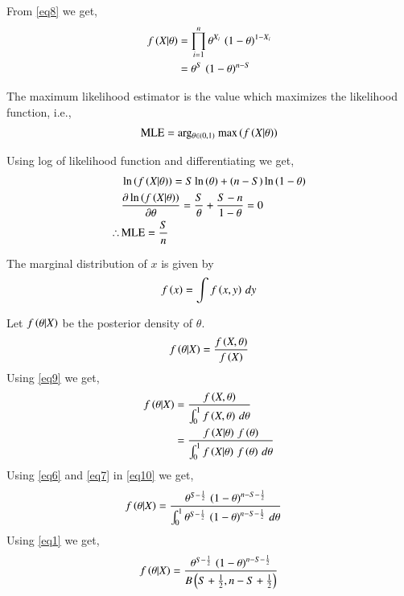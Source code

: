 \documentclass[journal,12pt,twocolumn]{IEEEtran}
\begin{document}
From \eqref{eq8} we get,
\begin{align}
    f\left(X|\theta\right) &= \prod_{i=1}^n\theta^{X_i}\,\left(1-\theta\right)^{1-X_i}\nonumber\\
    &=\theta^S\,\left(1-\theta\right)^{n-S}\label{eq7}
\end{align}
\begin{definition}
The maximum likelihood estimator is the value which maximizes the likelihood function, i.e.,
\begin{align}
    \text{MLE} = \text{arg$_{\theta \in (0,1)}$ max}\left(f\left(X|\theta\right)\right)
\end{align}
\end{definition}
Using log of likelihood function and differentiating we get,
\begin{align}
    &\ln\left({f\left(X|\theta\right)}\right) = S\ln\left({\theta}\right) + \left(n-S\right)\ln\left({1-\theta}\right)\\
    &\frac{\partial \ln\left({f\left(X|\theta\right)}\right)}{\partial \theta} = \frac{S}{\theta} + \frac{S-n}{1-\theta} = 0 \nonumber\\
     \therefore\, &\text{MLE} = \frac{S}{n}
\end{align}
\begin{definition}
The marginal distribution of $x$ is given by
\begin{align}
    f\left(x\right) = \int f\left(x,y\right)\,dy\label{eq9}
\end{align}
\end{definition}
\begin{lemma}
Let $f\left(\theta|X\right)$ be the posterior density of $\theta$.
\begin{align}
    f\left(\theta|X\right) = \frac{f\left(X,\theta\right)}{f\left(X\right)}
\end{align}
Using \eqref{eq9} we get,
\begin{align}
    f\left(\theta|X\right) &= \frac{f\left(X,\theta\right)}{\int_0^1 f\left(X,\theta\right)\,d\theta} \nonumber\\
    &= \frac{f\left(X|\theta\right)\, f\left(\theta\right)}{\int_0^1 f\left(X|\theta\right)\, f\left(\theta\right)\,d\theta}\label{eq10}
\end{align}
Using \eqref{eq6} and \eqref{eq7} in \eqref{eq10} we get,
\begin{align}
    f\left(\theta|X\right) &= \frac{\theta^{S-\frac{1}{2}}\,\left(1-\theta\right)^{n-S-\frac{1}{2}}}{\int_0^1 \theta^{S-\frac{1}{2}}\,\left(1-\theta\right)^{n-S-\frac{1}{2}}\,d\theta}
\end{align}
Using \eqref{eq1} we get,
\begin{align}
    f\left(\theta|X\right) = \frac{\theta^{S-\frac{1}{2}}\,\left(1-\theta\right)^{n-S-\frac{1}{2}}}{B\left(S+\frac{1}{2},n-S+\frac{1}{2}\right)}
\end{align}
\end{lemma}
\end{document}
